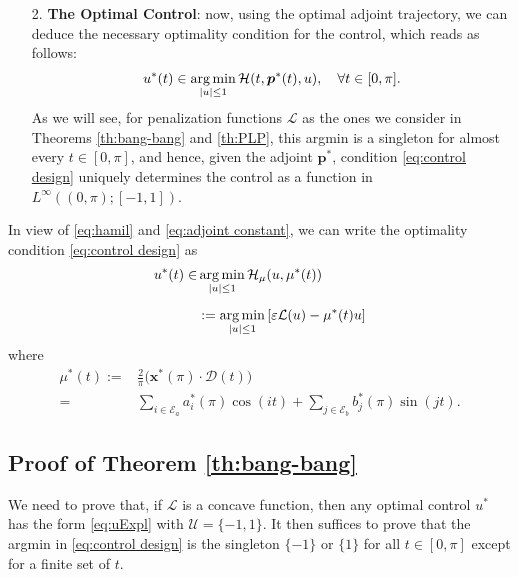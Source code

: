 \documentclass[twocolumn]{autart}    %
\begin{document}
\begin{remark}
\begin{itemize}
    \item[2.] \textbf{The Optimal  Control}: now, using the optimal adjoint trajectory, we can deduce the necessary optimality condition for the control, which reads as follows:
    \begin{align}\label{eq:control design}
    	u^* (t) \in \operatorname*{arg\,min}_{|u|\leq 1} \mathcal{H}(t,\bm{p}^*(t),u), \quad \forall t \in [0,\pi].
    \end{align}
    As we will see, for penalization functions $\mathcal{L}$ as the ones we consider in Theorems \ref{th:bang-bang} and \ref{th:PLP}, this argmin is a singleton for almost every $t\in [0,\pi]$, and hence, given the adjoint $\bm{p}^\ast$,  condition \eqref{eq:control design} uniquely determines the control as a function in $L^\infty((0,\pi);[-1,1])$.
\end{itemize}
    
In view of \eqref{eq:hamil} and \eqref{eq:adjoint constant}, we can write the optimality condition \eqref{eq:control design} as
\begin{align}\label{eq:control design2}
    u^\ast(t)  \in & \operatorname*{arg\,min}_{|u|\leq 1}  \mathcal{H}_\mu (u,\mu^\ast(t))  
    \\[5pt]
    &:=\operatorname*{arg\,min}_{|u|\leq 1}   \left[\varepsilon \mathcal{L}(u) - \mu^\ast(t) u \right] \nonumber
\end{align}    
where 
\begin{align}\label{eq:m ast}
    \mu^\ast (t) := & \frac 2\pi \big(\bm{x}^*(\pi) \cdot \bm{\mathcal{D}}(t)\big) 
    \\[5pt]
    = & \sum_{i \in \mathcal{E}_a} a^*_i (\pi) \cos(it) + \sum_{j \in \mathcal{E}_b} b^*_j (\pi) \sin(jt). \nonumber
\end{align}


\subsection{Proof of Theorem \ref{th:bang-bang}}\label{proof:bang-bang}

We need to prove that, if $\mathcal{L}$ is a concave function, then any optimal control $u^\ast$ has the form \eqref{eq:uExpl} with $\mathcal{U}=\{-1,1\}$. It then suffices to prove that the argmin in \eqref{eq:control design} is the singleton $\{-1\}$ or $\{1\}$ for all $t\in [0,\pi]$ except for a finite set of $t$.


\end{remark}
\end{document}
